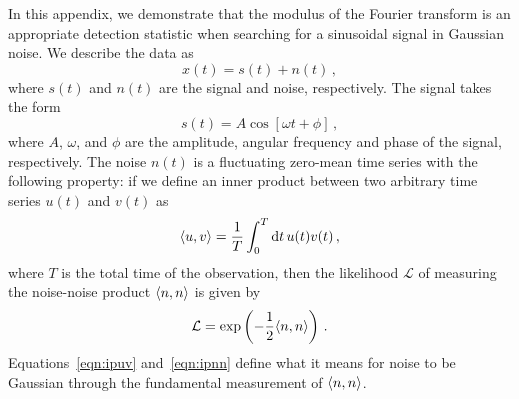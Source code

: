 \documentclass[paper-main.tex]{subfiles}
\begin{document}
In this appendix, we demonstrate that the modulus of the Fourier transform is an appropriate detection statistic when searching for a sinusoidal signal in Gaussian noise. 
We describe the data as
\begin{equation}
x(t) = s(t) + n(t)\,, 
\label{eqn:GNdata}
\end{equation}
where $s(t)$ and $n(t)$ are the signal and noise, respectively.
The signal takes the form
\begin{equation}
s(t) = A \cos\left[{\omega t + \phi}\right]\,,
\label{eqn:GNmodel}
\end{equation}
where $A$, $\omega$, and $\phi$ are the amplitude, angular frequency and phase of the signal, respectively. 
The noise $n(t)$ is a fluctuating zero-mean time series with the following property: if we define an inner product between two arbitrary time series $u(t)$ and $v(t)$ as 
\begin{equation}
\langle u,v \rangle = \frac{1}{T} \int_0^T \mathrm{d} t \, u(t) v(t)\,,
\label{eqn:ipuv}
\end{equation}
where $T$ is the total time of the observation, then the likelihood $\mathcal{L}$ of measuring the noise-noise product $\langle n,n \rangle$ is given by 
\begin{equation}
\mathcal{L} = \exp\left( -\frac{1}{2}\langle n,n \rangle\right)\,.
\label{eqn:ipnn}
\end{equation}
Equations~\ref{eqn:ipuv} and~\ref{eqn:ipnn} define what it means for noise to be Gaussian through the fundamental measurement of $\langle n,n \rangle$.

\end{document}
